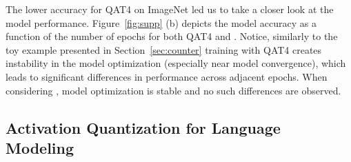 The lower accuracy for QAT4 on ImageNet led us to take a closer look at the model performance. Figure~\ref{fig:supp} (b) depicts the model accuracy as a function of the number of epochs for both QAT4 and \diffq. Notice, similarly to the toy example presented in Section~\ref{sec:counter} training with QAT4 creates instability in the model optimization (especially near model convergence), which leads to significant differences in performance across adjacent epochs. When considering \diffq, model optimization is stable and no such differences are observed. 







\subsection{Activation Quantization for Language Modeling}

